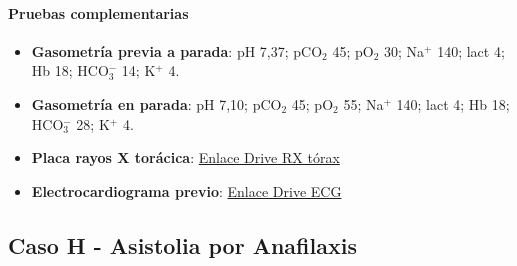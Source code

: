 \paragraph{Pruebas complementarias}
\begin{itemize}[topsep=0pt, partopsep=0pt,itemsep=0pt,parsep=0pt]
    \item \textbf{Gasometría previa a parada}: pH 7,37; pCO$_2$ 45; pO$_2$ 30; Na$^+$ 140; lact 4; Hb 18; HCO$_3^-$ 14; K$^+$ 4.
    \item \textbf{Gasometría en parada}: pH 7,10; pCO$_2$ 45; pO$_2$ 55; Na$^+$ 140; lact 4; Hb 18; HCO$_3^-$ 28; K$^+$ 4.
    \item \textbf{Placa rayos X torácica}: \href{https://drive.google.com/file/d/1lyg9P5pVMmjxd8ZkjwH\_SYt4QF4bie\_6/view?usp=share\_link}{Enlace Drive RX tórax}
    \item \textbf{Electrocardiograma previo}: \href{https://drive.google.com/file/d/1Wg0E\_7Jy2S\_in\_G2v75y7vmb-ilkWIRF/view?usp=share\_link}{Enlace Drive ECG}
\end{itemize}

\subsection{Caso H - Asistolia por Anafilaxis
}



